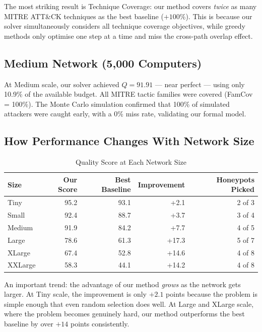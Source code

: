 \documentclass[journal]{IEEEtran}
\begin{document}
The most striking result is Technique Coverage: our method covers
\emph{twice} as many MITRE ATT\&CK techniques as the best baseline
($+100\%$). This is because our solver simultaneously considers all
technique coverage objectives, while greedy methods only optimise
one step at a time and miss the cross-path overlap effect.

\subsection{Medium Network (5,000 Computers)}

At Medium scale, our solver achieved $Q = 91.91$ --- near perfect
--- using only 10.9\% of the available budget. All MITRE tactic
families were covered (FamCov = 100\%). The Monte Carlo simulation
confirmed that 100\% of simulated attackers were caught early, with
a 0\% miss rate, validating our formal model.

\subsection{How Performance Changes With Network Size}

\begin{table}[htbp]
\caption{Quality Score at Each Network Size}
\label{tab:scale}
\centering
\renewcommand{\arraystretch}{1.2}
\begin{tabular}{@{}lrrrr@{}}
\toprule
\textbf{Size} & \textbf{Our Score} & \textbf{Best Baseline} &
\textbf{Improvement} & \textbf{Honeypots Picked} \\
\midrule
Tiny    & 95.2 & 93.1 &  +2.1 & 2 of 3 \\
Small   & 92.4 & 88.7 &  +3.7 & 3 of 4 \\
Medium  & 91.9 & 84.2 &  +7.7 & 4 of 5 \\
Large   & 78.6 & 61.3 & +17.3 & 5 of 7 \\
XLarge  & 67.4 & 52.8 & +14.6 & 4 of 8 \\
XXLarge & 58.3 & 44.1 & +14.2 & 4 of 8 \\
\bottomrule
\end{tabular}
\end{table}

An important trend: the advantage of our method \emph{grows} as
the network gets larger. At Tiny scale, the improvement is only
$+2.1$ points because the problem is simple enough that even
random selection does well. At Large and XLarge scale, where the
problem becomes genuinely hard, our method outperforms the best
baseline by over $+14$ points consistently.
\end{document}
